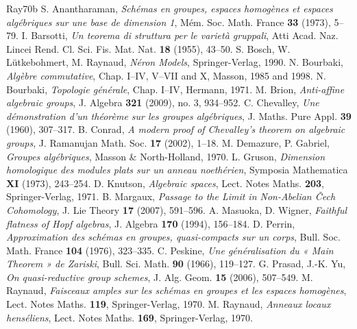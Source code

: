 \begin{thebibliography}{Ray70b}
S. Anantharaman, \emph{Schémas en groupes, espaces homogènes et espaces algébriques sur une base de dimension 1}, Mém. Soc. Math. France \textbf{33} (1973), 5--79.
I. Barsotti, \emph{Un teorema di struttura per le varietà gruppali}, Atti Acad. Naz. Lincei Rend. Cl. Sci. Fis. Mat. Nat. \textbf{18} (1955), 43--50.
S. Bosch, W. Lütkebohmert, M. Raynaud, \emph{Néron Models}, Springer-Verlag, 1990.
N. Bourbaki, \emph{Algèbre commutative}, Chap. I--IV, V--VII and X, Masson, 1985 and 1998.
N. Bourbaki, \emph{Topologie générale}, Chap. I--IV, Hermann, 1971.
M. Brion, \emph{Anti-affine algebraic groups}, J. Algebra \textbf{321} (2009), no. 3, 934--952.
C. Chevalley, \emph{Une démonstration d'un théorème sur les groupes algébriques}, J. Maths. Pure Appl. \textbf{39} (1960), 307--317.
B. Conrad, \emph{A modern proof of Chevalley's theorem on algebraic groups}, J. Ramanujan Math. Soc. \textbf{17} (2002), 1--18.
M. Demazure, P. Gabriel, \emph{Groupes algébriques}, Masson \& North-Holland, 1970.
L. Gruson, \emph{Dimension homologique des modules plats sur un anneau noethérien}, Symposia Mathematica \textbf{XI} (1973), 243--254.
D. Knutson, \emph{Algebraic spaces}, Lect. Notes Maths. \textbf{203}, Springer-Verlag, 1971.
B. Margaux, \emph{Passage to the Limit in Non-Abelian Čech Cohomology}, J. Lie Theory \textbf{17} (2007), 591--596.
A. Masuoka, D. Wigner, \emph{Faithful flatness of Hopf algebras}, J. Algebra \textbf{170} (1994), 156--184.
D. Perrin, \emph{Approximation des schémas en groupes, quasi-compacts sur un corps}, Bull. Soc. Math. France \textbf{104} (1976), 323--335.
C. Peskine, \emph{Une généralisation du « Main Theorem » de Zariski}, Bull. Sci. Math. \textbf{90} (1966), 119--127.
G. Prasad, J.-K. Yu, \emph{On quasi-reductive group schemes}, J. Alg. Geom. \textbf{15} (2006), 507--549.
M. Raynaud, \emph{Faisceaux amples sur les schémas en groupes et les espaces homogènes}, Lect. Notes Maths. \textbf{119}, Springer-Verlag, 1970.
M. Raynaud, \emph{Anneaux locaux henséliens}, Lect. Notes Maths. \textbf{169}, Springer-Verlag, 1970.

\end{thebibliography}
